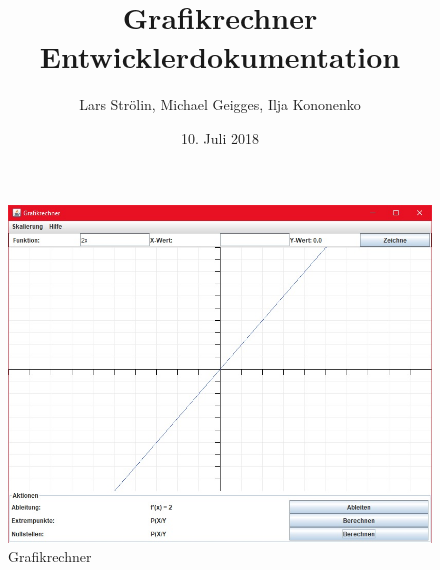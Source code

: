 \documentclass[11pt]{article}
\begin{document}
\begin{titlepage}

\author{Lars Strölin, Michael Geigges, Ilja Kononenko} 
\title{Grafikrechner Entwicklerdokumentation} 
\date{10. Juli 2018} 
\maketitle

\setcounter{page}{1}

\begin{figure}[ht]
	\centering
	\includegraphics[width=1.0\textwidth]{Bilder/GR_1.jpg}
	\caption{Grafikrechner}
\end{figure}

\end{titlepage}


\tableofcontents
\newpage




%



\printindex
\end{document}
